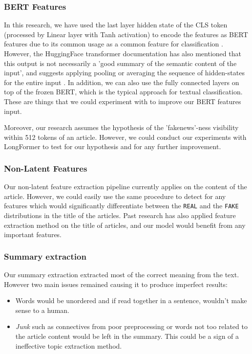 \documentclass{article}
\begin{document}
\subsubsection*{BERT Features}\label{limitation:bert-features}
In this research, we have used the last layer hidden state of the CLS token (processed by Linear layer with Tanh activation) to encode the features as BERT features due to its common usage as a common feature for classification \cite{huggingface-transformer}. However, the HuggingFace transformer documentation has also mentioned that this output is not necessarily a 'good summary of the semantic content of the input', and suggests applying pooling or averaging the sequence of hidden-states for the entire input \cite{huggingface-transformer}. In addition, we can also use the fully connected layers on top of the frozen BERT, which is the typical approach for textual classification. These are things that we could experiment with to improve our BERT features input.

Moreover, our research assumes the hypothesis of the 'fakenews'-ness visibility within 512 tokens of an article. However, we could conduct our experiments with LongFormer to test for our hypothesis and for any further improvement.

\subsubsection*{Non-Latent Features}\label{limitation:non-latent-features}
Our non-latent feature extraction pipeline currently applies on the content of the article. However, we could easily use the same procedure to detect for any features which would significantly differentiate between the \texttt{REAL} and the \texttt{FAKE} distributions in the title of the articles. Past research has also applied feature extraction method on the title of articles, and our model would benefit from any important features.

\subsubsection*{Summary extraction}\label{limitation:summary-extraction}

Our summary extraction extracted most of the correct meaning from the text. However two main issues remained causing it to produce imperfect results:
\begin{itemize}
  \item Words would be unordered and if read together in a sentence, wouldn't make sense to a human.
  \item \emph{Junk} such as connectives from poor preprocessing or words not too related to the article content would be left in the summary. This could be a sign of a ineffective topic extraction method.
\end{itemize}
\end{document}
